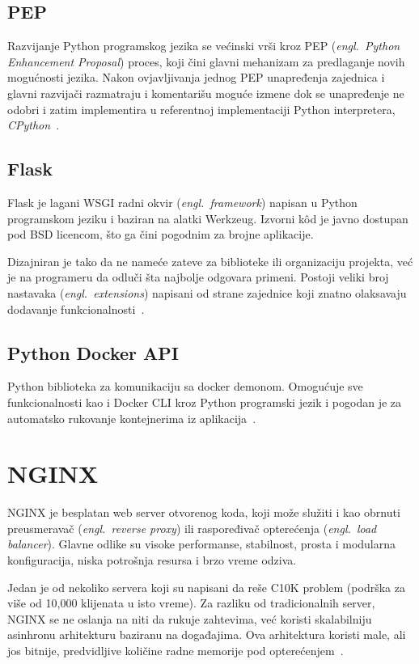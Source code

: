 \documentclass[12pt]{report}
\begin{document}
\subsection{PEP}
Razvijanje Python programskog jezika se većinski vrši kroz PEP (\textit{engl.\ Python Enhancement Proposal}) proces, koji čini glavni mehanizam za predlaganje novih mogućnosti jezika. Nakon ovjavljivanja jednog PEP unapređenja zajednica i glavni razvijači razmatraju i komentarišu moguće izmene dok se unapređenje ne odobri i zatim implementira u referentnoj implementaciji Python interpretera, \textit{CPython}~\cite{python-pep}.

\subsection{Flask}
Flask je lagani \acrshort{WSGI} radni okvir (\textit{engl.\ framework}) napisan u Python programskom jeziku i baziran na alatki Werkzeug. Izvorni kôd je javno dostupan pod BSD licencom, što ga čini pogodnim za brojne aplikacije.

Dizajniran je tako da ne nameće zateve za biblioteke ili organizaciju projekta, već je na programeru da odluči šta najbolje odgovara primeni. Postoji veliki broj nastavaka (\textit{engl.\ extensions}) napisani od strane zajednice koji znatno olaksavaju dodavanje funkcionalnosti~\cite{flask}.

\subsection{Python Docker API}
Python biblioteka za komunikaciju sa docker demonom. Omogućuje sve funkcionalnosti kao i Docker CLI kroz Python programski jezik i pogodan je za automatsko rukovanje kontejnerima iz aplikacija~\cite{docker-py}.

\section{NGINX}
NGINX je besplatan web server otvorenog koda, koji može služiti i kao obrnuti preusmeravač (\textit{engl.\ reverse proxy}) ili raspoređivač opterećenja (\textit{engl.\ load balancer}). Glavne odlike su visoke performanse, stabilnost, prosta i modularna konfiguracija, niska potrošnja resursa i brzo vreme odziva.

Jedan je od nekoliko servera koji su napisani da reše C10K problem (podrška za više od 10,000 klijenata u isto vreme). Za razliku od tradicionalnih server, NGINX se ne oslanja na niti da rukuje zahtevima, već koristi skalabilniju asinhronu arhitekturu baziranu na događajima. Ova arhitektura koristi male, ali jos bitnije, predvidljive količine radne memorije pod opterećenjem~\cite{nginx}.
\end{document}
